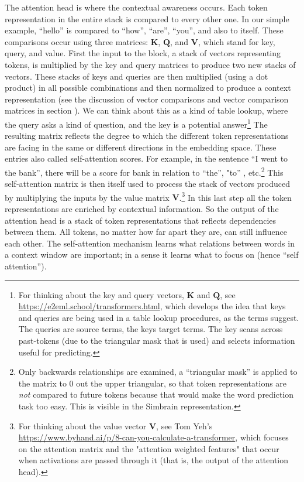 The attention head is where the contextual awareness occurs. Each token representation in the entire stack is compared to every other one.  In our simple example, ``hello'' is compared to ``how'', ``are'',  ``you'', and also to itself. These comparisons occur using three matrices: $\textbf{K}$, $\textbf{Q}$, and $\textbf{V}$, which stand for key, query, and value. First the input to the block, a stack of vectors representing tokens, is multiplied by the key and query matrices to produce two new stacks of vectors. These stacks of keys and queries are then multiplied (using a dot product) in all possible combinations and then normalized to produce a context representation (see the discussion of vector comparisons and vector comparison matrices in section ). We can think about this as a kind of table lookup, where the query asks a kind of question, and the key is a potential answer\footnote{For thinking about the key and query vectors, $\textbf{K}$ and $\textbf{Q}$, see \url{https://e2eml.school/transformers.html}, which develops the idea that keys and queries are being used in a table lookup procedures, as the terms suggest. The queries are source terms, the keys target terms. The key scans across past-tokens (due to the triangular mask that is used) and selects information useful for predicting.} The resulting matrix reflects the degree to which the different token representations are facing in the same or different directions in the embedding space. These entries also called self-attention scores. For example, in the sentence ``I went to the bank'', there will be a score for bank in relation to ``the'', "to'' , etc.\footnote{Only backwards relationships are examined, a ``triangular mask'' is applied to the matrix to 0 out the upper triangular, so that token representations are \emph{not} compared to future tokens because that would make the word prediction task too easy. This is visible in the Simbrain representation.}  This self-attention matrix is then itself used to process the stack of vectors produced by multiplying the inputs by the value matrix  $\textbf{V}$.\footnote{For thinking about the value vector $\textbf{V}$, see Tom Yeh's \url{https://www.byhand.ai/p/8-can-you-calculate-a-transformer}, which focuses on the attention matrix and the "attention weighted features" that occur when activations are passed through it (that is, the output of the attention head).}  In this last step all the token representations are enriched by contextual information. So the output of the attention head is a stack of token representations that reflects dependencies between them. All tokens, no matter how far apart they are, can still influence each other. The self-attention mechanism learns what relations between words in a context window are important; in a sense it learns what to focus on (hence ``self attention'').

